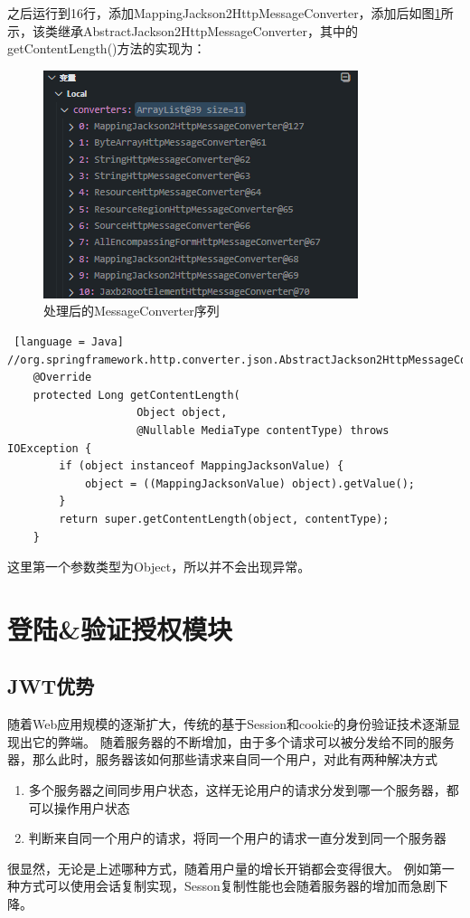 之后运行到16行，添加MappingJackson2HttpMessageConverter，添加后如图\ref{MessageConverter-list-after-add}所示，该类继承AbstractJackson2HttpMessageConverter，其中的getContentLength()方法的实现为：

\begin{figure}[H]
  \centering
  \includegraphics[scale = 0.8]{out/figure/统一返回对象/WebMvcConfiguration-MessageConverter-debug-after-add.png}
  \caption{\song\wuhao 处理后的MessageConverter序列}
  \label{MessageConverter-list-after-add}
\end{figure}

\begin{lstlisting} [language = Java]
//org.springframework.http.converter.json.AbstractJackson2HttpMessageConverter;
	@Override
	protected Long getContentLength(
                    Object object, 
                    @Nullable MediaType contentType) throws IOException {
		if (object instanceof MappingJacksonValue) {
			object = ((MappingJacksonValue) object).getValue();
		}
		return super.getContentLength(object, contentType);
	}
\end{lstlisting}

这里第一个参数类型为Object，所以并不会出现异常。

\section{登陆\&验证授权模块}

\subsection{JWT优势}

随着Web应用规模的逐渐扩大，传统的基于Session和cookie的身份验证技术逐渐显现出它的弊端。
随着服务器的不断增加，由于多个请求可以被分发给不同的服务器，那么此时，服务器该如何那些请求来自同一个用户，对此有两种解决方式
\begin{enumerate}
  \item 多个服务器之间同步用户状态，这样无论用户的请求分发到哪一个服务器，都可以操作用户状态
  \item 判断来自同一个用户的请求，将同一个用户的请求一直分发到同一个服务器
\end{enumerate}
很显然，无论是上述哪种方式，随着用户量的增长开销都会变得很大。
例如第一种方式可以使用会话复制实现，Sesson复制性能也会随着服务器的增加而急剧下降。\cite{.2019h}

